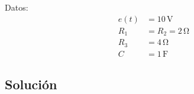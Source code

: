 \begin{minipage}{0.5\linewidth}
\end{minipage}
\begin{minipage}{0.5\linewidth}
  \hspace{20mm} Datos:
    \begin{align*}
    e(t) &= 10\,\unit{\volt}\\
    R_1 &= R_2 = 2 \,\unit{\ohm}\\
    R_3 &= 4 \,\unit{\ohm}\\
    C &= 1 \,\unit{\farad}
  \end{align*}
\end{minipage}

\subsection*{Solución}


